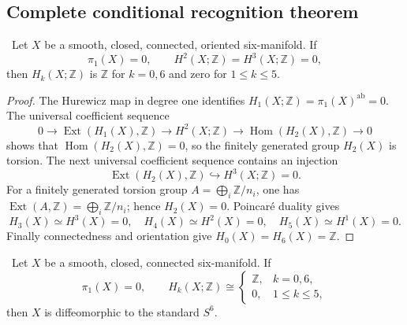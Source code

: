 \subsection{Complete conditional recognition theorem}

\begin{lemma}
\label{lem:cohomological-closure}
\Verified\ Let $X$ be a smooth, closed, connected, oriented six-manifold.
If
\[
\pi_1(X)=0,
\qquad H^2(X;\mathbb Z)=H^3(X;\mathbb Z)=0,
\tag{4.3}
\]
then $H_k(X;\mathbb Z)$ is $\mathbb Z$ for $k=0,6$ and zero for
$1\le k\le5$.
\end{lemma}

\begin{proof}
The Hurewicz map in degree one identifies
$H_1(X;\mathbb Z)=\pi_1(X)^{\mathrm{ab}}=0$.  The universal coefficient
sequence
\[
0\longrightarrow\operatorname{Ext}(H_1(X),\mathbb Z)
\longrightarrow H^2(X;\mathbb Z)
\longrightarrow\operatorname{Hom}(H_2(X),\mathbb Z)
\longrightarrow0
\]
shows that $\operatorname{Hom}(H_2(X),\mathbb Z)=0$, so the finitely
generated group $H_2(X)$ is torsion.  The next universal coefficient
sequence contains an injection
\[
\operatorname{Ext}(H_2(X),\mathbb Z)
\hookrightarrow H^3(X;\mathbb Z)=0.
\]
For a finitely generated torsion group
$A=\bigoplus_i\mathbb Z/n_i$, one has
$\operatorname{Ext}(A,\mathbb Z)=\bigoplus_i\mathbb Z/n_i$; hence
$H_2(X)=0$.  Poincar\'e duality gives
\[
H_3(X)\simeq H^3(X)=0,\quad
H_4(X)\simeq H^2(X)=0,\quad
H_5(X)\simeq H^1(X)=0.
\]
Finally connectedness and orientation give $H_0(X)=H_6(X)=\mathbb Z$.
\end{proof}

\begin{theorem}
\label{thm:sphere-recognition}
\Conditional\ Let $X$ be a smooth, closed, connected six-manifold.  If
\[
\pi_1(X)=0,\qquad
H_k(X;\mathbb Z)\cong
\begin{cases}
\mathbb Z,&k=0,6,\\
0,&1\le k\le5,
\end{cases}
\tag{4.4}
\]
then $X$ is diffeomorphic to the standard $S^6$.
\end{theorem}

